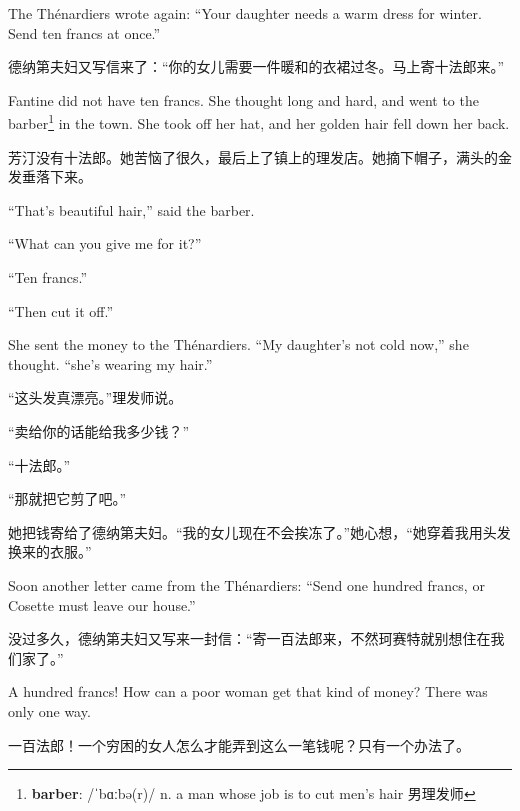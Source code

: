 \documentclass[fontset=ubuntu, zihao=5]{ctexart}
\newcommand\doulos[1]{{\fontspec{Doulos SIL} /#1/}}
\begin{document}
\begin{paracol}{2}
  \switchcolumn*

  The Thénardiers wrote again: ``Your daughter needs a warm dress for winter. Send ten francs at once.''

  \switchcolumn

  德纳第夫妇又写信来了：“你的女儿需要一件暖和的衣裙过冬。马上寄十法郎来。”

  \switchcolumn*

  Fantine did not have ten francs. She thought long and hard, and went to the
  barber\footnote{\textbf{barber}: \doulos{ˈbɑːbə(r)} n. a man whose job is
    to cut men's hair 男理发师} in the town. She took off her hat, and her
  golden hair fell down her back.

  \switchcolumn

  芳汀没有十法郎。她苦恼了很久，最后上了镇上的理发店。她摘下帽子，满头的金发垂落下来。

  \switchcolumn*

  ``That's beautiful hair,'' said the barber.


  ``What can you give me for it?''


  ``Ten francs.''


  ``Then cut it off.''


  She sent the money to the Thénardiers. ``My daughter's not cold now,'' she thought. ``she's wearing my hair.''

  \switchcolumn

  “这头发真漂亮。”理发师说。


  “卖给你的话能给我多少钱？”


  “十法郎。”


  “那就把它剪了吧。”


  她把钱寄给了德纳第夫妇。“我的女儿现在不会挨冻了。”她心想，“她穿着我用头发换来的衣服。”

  \switchcolumn*

  Soon another letter came from the Thénardiers: ``Send one hundred francs, or Cosette must leave our house.''

  \switchcolumn

  没过多久，德纳第夫妇又写来一封信：“寄一百法郎来，不然珂赛特就别想住在我们家了。”

  \switchcolumn*

  A hundred francs! How can a poor woman get that kind of money? There was only one way.

  \switchcolumn

  一百法郎！一个穷困的女人怎么才能弄到这么一笔钱呢？只有一个办法了。


\end{paracol}
\end{document}
